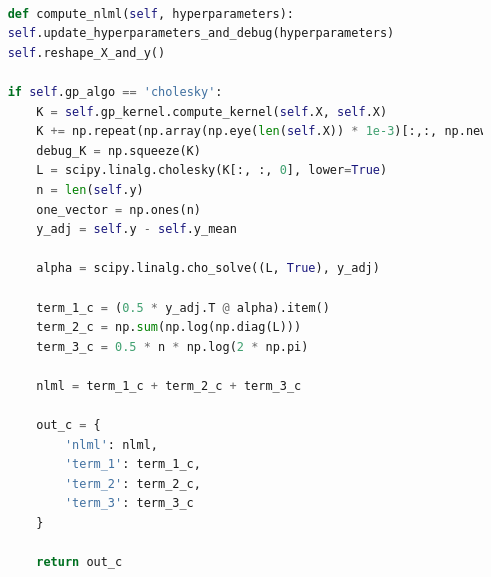 \newpage

\begin{lstlisting}[caption={Method used to calculate the Negative Log Marginal Likelihood (NLML).}, language=Python, label={lst:NLML}]

    def compute_nlml(self, hyperparameters):
    self.update_hyperparameters_and_debug(hyperparameters)
    self.reshape_X_and_y()

    if self.gp_algo == 'cholesky':
        K = self.gp_kernel.compute_kernel(self.X, self.X)
        K += np.repeat(np.array(np.eye(len(self.X)) * 1e-3)[:,:, np.newaxis], self.X.shape[1], axis=2)
        debug_K = np.squeeze(K)
        L = scipy.linalg.cholesky(K[:, :, 0], lower=True)
        n = len(self.y)
        one_vector = np.ones(n)
        y_adj = self.y - self.y_mean

        alpha = scipy.linalg.cho_solve((L, True), y_adj)

        term_1_c = (0.5 * y_adj.T @ alpha).item()
        term_2_c = np.sum(np.log(np.diag(L)))
        term_3_c = 0.5 * n * np.log(2 * np.pi)

        nlml = term_1_c + term_2_c + term_3_c

        out_c = {
            'nlml': nlml,
            'term_1': term_1_c,
            'term_2': term_2_c,
            'term_3': term_3_c
        }

        return out_c

\end{lstlisting}


